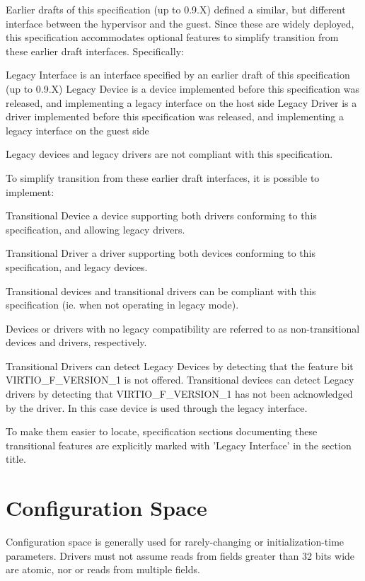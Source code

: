 Earlier drafts of this specification (up to 0.9.X) defined a similar, but
different interface between the hypervisor and the guest.
Since these are widely deployed, this specification
accommodates optional features to simplify transition
from these earlier draft interfaces. Specifically:

Legacy Interface
        is an interface specified by an earlier draft of this specification
        (up to 0.9.X)
Legacy Device
        is a device implemented before this specification was released,
        and implementing a legacy interface on the host side
Legacy Driver
        is a driver implemented before this specification was released,
        and implementing a legacy interface on the guest side

Legacy devices and legacy drivers are not compliant with this
specification.

To simplify transition from these earlier draft interfaces,
it is possible to implement:

Transitional Device
        a device supporting both drivers conforming to this
        specification, and allowing legacy drivers.

Transitional Driver
        a driver supporting both devices conforming to this
        specification, and legacy devices.

Transitional devices and transitional drivers can be compliant with
this specification (ie. when not operating in legacy mode).

Devices or drivers with no legacy compatibility are referred to as
non-transitional devices and drivers, respectively.

Transitional Drivers can detect Legacy Devices by detecting that
the feature bit VIRTIO_F_VERSION_1 is not offered.
Transitional devices can detect Legacy drivers by detecting that
VIRTIO_F_VERSION_1 has not been acknowledged by the driver.
In this case device is used through the legacy interface.

To make them easier to locate, specification sections documenting
these transitional features are explicitly marked with 'Legacy
Interface' in the section title.

\section{Configuration Space}\label{sec:Basic Facilities of a Virtio Device / Configuration Space}

Configuration space is generally used for rarely-changing or
initialization-time parameters.  Drivers must not assume reads from
fields greater than 32 bits wide are atomic, nor or reads from
multiple fields.


